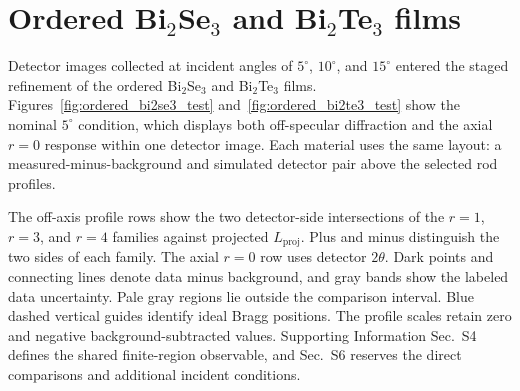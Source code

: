 \section{Ordered Bi\texorpdfstring{$_2$}{2}Se\texorpdfstring{$_3$}{3} and Bi\texorpdfstring{$_2$}{2}Te\texorpdfstring{$_3$}{3} films}
\label{sec:results_ordered}

Detector images collected at incident angles of $5^\circ$, $10^\circ$, and $15^\circ$ entered the staged refinement of the ordered Bi$_2$Se$_3$ and Bi$_2$Te$_3$ films. Figures~\ref{fig:ordered_bi2se3_test} and~\ref{fig:ordered_bi2te3_test} show the nominal $5^\circ$ condition, which displays both off-specular diffraction and the axial $r=0$ response within one detector image. Each material uses the same layout: a measured-minus-background and simulated detector pair above the selected rod profiles.

The off-axis profile rows show the two detector-side intersections of the $r=1$, $r=3$, and $r=4$ families against projected $L_{\mathrm{proj}}$. Plus and minus distinguish the two sides of each family. The axial $r=0$ row uses detector $2\theta$. Dark points and connecting lines denote data minus background, and gray bands show the labeled data uncertainty. Pale gray regions lie outside the comparison interval. Blue dashed vertical guides identify ideal Bragg positions. The profile scales retain zero and negative background-subtracted values. Supporting Information Sec.~S4 defines the shared finite-region observable, and Sec.~S6 reserves the direct comparisons and additional incident conditions.

